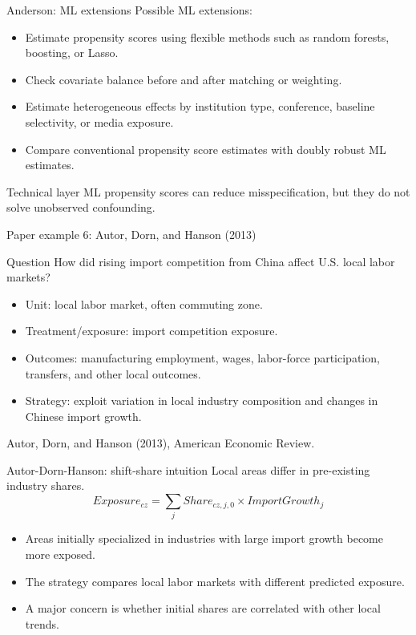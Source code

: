 \documentclass[aspectratio=169,11pt]{beamer}
\newcommand{\grad}[1]{\begin{alertblock}{Technical layer}#1\end{alertblock}}
\newcommand{\smallcite}[1]{{\scriptsize \textcolor{WLUGray}{#1}}}
\begin{document}
\begin{frame}{Anderson: ML extensions}
Possible ML extensions:
\begin{itemize}
  \item Estimate propensity scores using flexible methods such as random forests, boosting, or Lasso.
  \item Check covariate balance before and after matching or weighting.
  \item Estimate heterogeneous effects by institution type, conference, baseline selectivity, or media exposure.
  \item Compare conventional propensity score estimates with doubly robust ML estimates.
\end{itemize}
\grad{
ML propensity scores can reduce misspecification, but they do not solve unobserved confounding.
}
\end{frame}

\begin{frame}{Paper example 6: Autor, Dorn, and Hanson (2013)}
\begin{block}{Question}
How did rising import competition from China affect U.S. local labor markets?
\end{block}
\begin{itemize}
  \item Unit: local labor market, often commuting zone.
  \item Treatment/exposure: import competition exposure.
  \item Outcomes: manufacturing employment, wages, labor-force participation, transfers, and other local outcomes.
  \item Strategy: exploit variation in local industry composition and changes in Chinese import growth.
\end{itemize}
\smallcite{Autor, Dorn, and Hanson (2013), American Economic Review.}
\end{frame}

\begin{frame}{Autor-Dorn-Hanson: shift-share intuition}
Local areas differ in pre-existing industry shares.
\[
Exposure_{cz} = \sum_j Share_{cz,j,0}\times ImportGrowth_j
\]
\begin{itemize}
  \item Areas initially specialized in industries with large import growth become more exposed.
  \item The strategy compares local labor markets with different predicted exposure.
  \item A major concern is whether initial shares are correlated with other local trends.
\end{itemize}
\end{frame}
\end{document}

